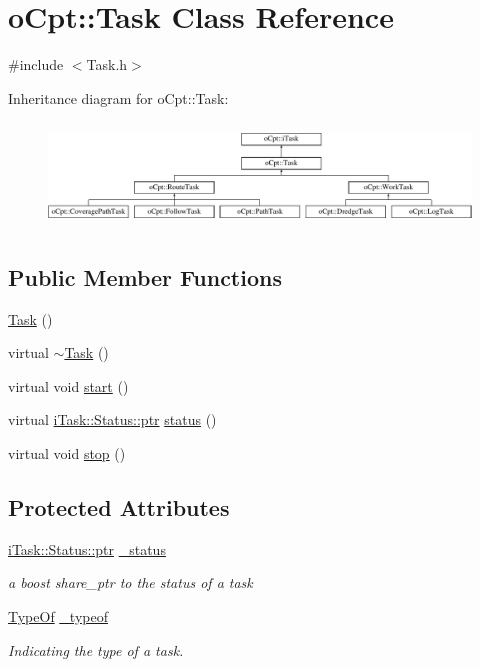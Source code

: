 \hypertarget{classo_cpt_1_1_task}{}\section{o\+Cpt\+:\+:Task Class Reference}
\label{classo_cpt_1_1_task}


{\ttfamily \#include $<$Task.\+h$>$}

Inheritance diagram for o\+Cpt\+:\+:Task\+:\begin{figure}[H]
\begin{center}
\leavevmode
\includegraphics[height=2.817610cm]{classo_cpt_1_1_task}
\end{center}
\end{figure}
\subsection*{Public Member Functions}
\begin{DoxyCompactItemize}
\item 
\hyperlink{classo_cpt_1_1_task_a3e330f63b2cfbff02e3db314d145968a}{Task} ()
\item 
virtual \hyperlink{classo_cpt_1_1_task_a95accf06842f78630e44190c15d6fca4}{$\sim$\+Task} ()
\item 
virtual void \hyperlink{classo_cpt_1_1_task_a8acd8d2125df0aef37eb1ebf0e3e49c8}{start} ()
\item 
virtual \hyperlink{classo_cpt_1_1i_task_1_1_status_aaf766c58d038e2defc3de2dddb92d1eb}{i\+Task\+::\+Status\+::ptr} \hyperlink{classo_cpt_1_1_task_a724445e158919a4b5644d8eef9f7c754}{status} ()
\item 
virtual void \hyperlink{classo_cpt_1_1_task_a62b4f1bbc1cf24434d2a2130162507f7}{stop} ()
\end{DoxyCompactItemize}
\subsection*{Protected Attributes}
\begin{DoxyCompactItemize}
\item 
\hyperlink{classo_cpt_1_1i_task_1_1_status_aaf766c58d038e2defc3de2dddb92d1eb}{i\+Task\+::\+Status\+::ptr} \hyperlink{classo_cpt_1_1_task_a51a0e1718a13e6d59af76511e6473743}{\+\_\+status}
\begin{DoxyCompactList}\small\item\em a boost share\+\_\+ptr to the status of a task \end{DoxyCompactList}\item 
\hyperlink{classo_cpt_1_1i_task_a10d8726eb8957c2c305f468cf15b9f11}{Type\+Of} \hyperlink{classo_cpt_1_1_task_ac4073446fdd30a1f2296da6b6fcaf802}{\+\_\+typeof}
\begin{DoxyCompactList}\small\item\em Indicating the type of a task. \end{DoxyCompactList}\end{DoxyCompactItemize}
